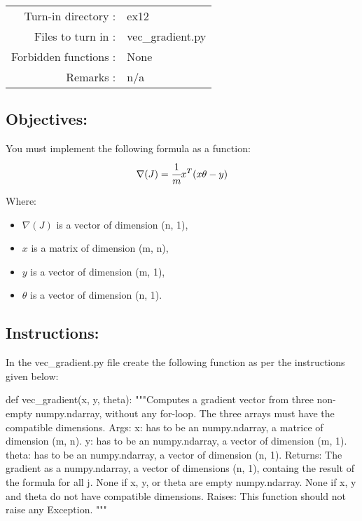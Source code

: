\documentclass[]{article}
\newenvironment{Shaded}{\begin{snugshade}}{\end{snugshade}}
\newcommand{\CommentTok}[1]{\textcolor[rgb]{0.48,0.49,0.49}{#1}}
\newcommand{\KeywordTok}[1]{\textcolor[rgb]{0.81,0.81,0.76}{#1}}
\newcommand{\NormalTok}[1]{\textcolor[rgb]{0.81,0.81,0.76}{#1}}
\begin{document}
\begin{longtable}[]{@{}rl@{}}
\toprule
\endhead
Turn-in directory : & ex12\tabularnewline
Files to turn in : & vec\_gradient.py\tabularnewline
Forbidden functions : & None\tabularnewline
Remarks : & n/a\tabularnewline
\bottomrule
\end{longtable}

\hypertarget{objectives}{%
\subsection{Objectives:}\label{objectives}}

You must implement the following formula as a function:\\
\large \[
\nabla(J) = \cfrac{1}{m} x^T(x\theta - y)
\] \normalsize

Where:

\begin{itemize}
\item
  \(\nabla(J)\) is a vector of dimension (n, 1),
\item
  \(x\) is a matrix of dimension (m, n),
\item
  \(y\) is a vector of dimension (m, 1),
\item
  \(\theta\) is a vector of dimension (n, 1).
\end{itemize}

\hypertarget{instructions-8}{%
\subsection{Instructions:}\label{instructions-8}}

In the vec\_gradient.py file create the following function as per the
instructions given below:

\begin{Shaded}
\begin{Highlighting}[]
\KeywordTok{def}\NormalTok{ vec_gradient(x, y, theta):}
    \CommentTok{"""Computes a gradient vector from three non-empty numpy.ndarray, without any for-loop. The three arrays must have the compatible dimensions.}
\CommentTok{    Args:}
\CommentTok{      x: has to be an numpy.ndarray, a matrice of dimension (m, n).}
\CommentTok{      y: has to be an numpy.ndarray, a vector of dimension (m, 1).}
\CommentTok{      theta: has to be an numpy.ndarray, a vector of dimension (n, 1).}
\CommentTok{    Returns:}
\CommentTok{      The gradient as a numpy.ndarray, a vector of dimensions (n, 1), containg the result of the formula for all j.}
\CommentTok{      None if x, y, or theta are empty numpy.ndarray.}
\CommentTok{      None if x, y and theta do not have compatible dimensions.}
\CommentTok{    Raises:}
\CommentTok{      This function should not raise any Exception.}
\CommentTok{    """}
\end{Highlighting}
\end{Shaded}
\end{document}
